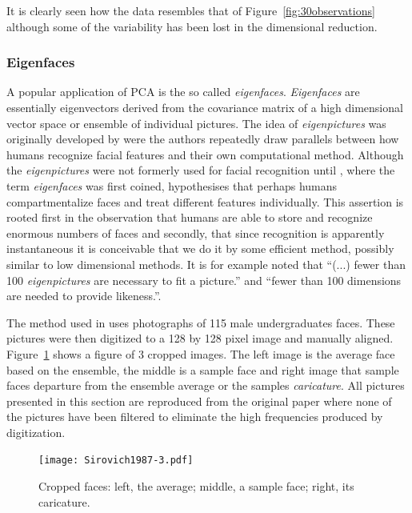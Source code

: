 It is clearly seen how the data resembles that of Figure~\ref{fig:30observations} although some of the variability has been lost in the dimensional reduction.

\subsubsection{Eigenfaces}
A popular application of PCA is the so called \emph{eigenfaces}. \emph{Eigenfaces} are essentially eigenvectors derived from the covariance matrix of a high dimensional vector space or ensemble of individual pictures. The idea of \emph{eigenpictures} was originally developed by \cite{Sirovich1987} were the authors repeatedly draw parallels between how humans recognize facial features and their own computational method. Although the \emph{eigenpictures} were not formerly used for facial recognition until \cite{Turk1991}, where the term \emph{eigenfaces} was first coined, \cite{Sirovich1987} hypothesises that perhaps humans compartmentalize faces and treat different features individually. This assertion is rooted first in the observation that humans are able to store and recognize enormous numbers of faces and secondly, that since recognition is apparently instantaneous it is conceivable that we do it by some efficient method, possibly similar to low dimensional methods. It is for example noted that ``(...) fewer than 100 \emph{eigenpictures} are necessary to fit a picture.'' and ``fewer than 100 dimensions are needed to provide likeness.''.

The method used in \cite{Sirovich1987} uses photographs of 115 male undergraduates faces. These pictures were then digitized to a 128 by 128 pixel image and manually aligned. Figure~\ref{fig:Sirovich1987-3} shows a figure of 3 cropped images. The left image is the average face based on the ensemble, the middle is a sample face and right image that sample faces departure from the ensemble average or the samples \emph{caricature}. All pictures presented in this section are reproduced from the original paper \cite{Sirovich1987} where none of the pictures have been filtered to eliminate the high frequencies produced by digitization.

\begin{figure}[!]
  \begin{center}
    \texttt{[image: Sirovich1987-3.pdf]}
    \caption{Cropped faces: left, the average; middle, a sample face; right, its caricature.}\label{fig:Sirovich1987-3}
  \end{center}
\end{figure}

